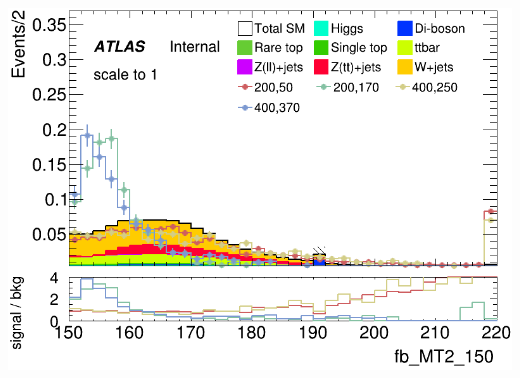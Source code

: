 \documentclass[usenames,dvipsnames]{beamer}
\begin{document}
\begin{frame}
\begin{minipage}{0.32\textwidth}
        \includegraphics[width=\textwidth]{graphics/LH_met_sig/LH_fb_MT2_150_norm.png}
    \end{minipage}
\end{frame}
\end{document}
